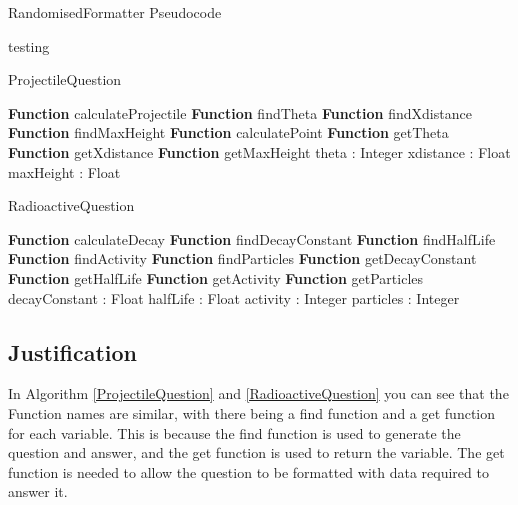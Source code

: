 \begin{algorithm}[h]
\label{randomformatterps}
\caption{RandomisedFormatter Pseudocode}
	\begin{algorithmic}[1]
		\State testing
	\end{algorithmic}
\end{algorithm}
\begin{algorithm}[h]\label{ProjectileQuestion}
	\caption{ProjectileQuestion}
	\begin{algorithmic}[1]
		\public
		\State \textbf{Function} calculateProjectile
		\State \textbf{Function} findTheta
		\State \textbf{Function} findXdistance
		\State \textbf{Function} findMaxHeight
		\State \textbf{Function} calculatePoint
		\State \textbf{Function} getTheta
		\State \textbf{Function} getXdistance
		\State \textbf{Function} getMaxHeight
		\endpublic
		\private
		\State theta : Integer
		\State xdistance : Float
		\State maxHeight : Float
		\endprivate
		\EndProcedure
	\end{algorithmic}
\end{algorithm}
\begin{algorithm}[h]\label{RadioactiveQuestion}
	\caption{RadioactiveQuestion}
	\begin{algorithmic}[1]
		\public
		\State \textbf{Function} calculateDecay
		\State \textbf{Function} findDecayConstant
		\State \textbf{Function} findHalfLife
		\State \textbf{Function} findActivity
		\State \textbf{Function} findParticles
		\State \textbf{Function} getDecayConstant
		\State \textbf{Function} getHalfLife
		\State \textbf{Function} getActivity
		\State \textbf{Function} getParticles
		\endpublic
		\private
		\State decayConstant : Float
		\State halfLife : Float
		\State activity : Integer
		\State particles : Integer
		\endprivate
		\EndProcedure
	\end{algorithmic}
\end{algorithm}
\clearpage
\subsection{Justification}
In Algorithm \ref{ProjectileQuestion} and \ref{RadioactiveQuestion} you can see that the Function names are similar, with there being a find function and a get function for each variable. This is because the find function is used to generate the question and answer, and the get function is used to return the variable. The get function is needed to allow the question to be formatted with data required to answer it.

